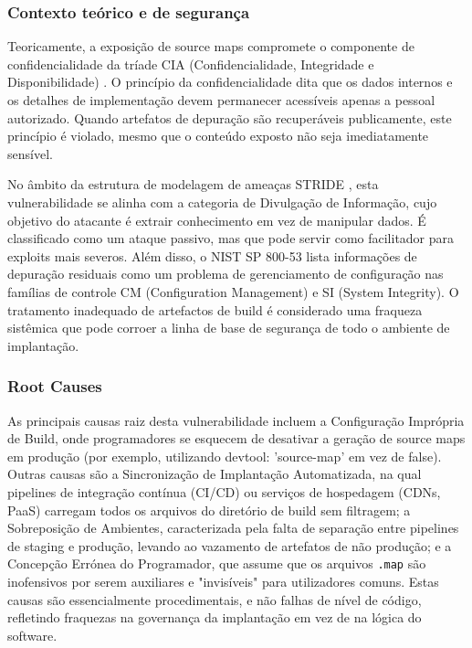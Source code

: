 \subsubsection{Contexto teórico e de segurança}
\label{subsubsec:contexto-teorico-SME}

Teoricamente, a exposição de source maps compromete o componente de confidencialidade da tríade CIA (Confidencialidade, Integridade e Disponibilidade) \cite{ref47}. O princípio da confidencialidade dita que os dados internos e os detalhes de implementação devem permanecer acessíveis apenas a pessoal autorizado. Quando artefatos de depuração são recuperáveis publicamente, este princípio é violado, mesmo que o conteúdo exposto não seja imediatamente sensível. 

No âmbito da estrutura de modelagem de ameaças STRIDE \cite{ref44}, esta vulnerabilidade se alinha com a categoria de Divulgação de Informação, cujo objetivo do atacante é extrair conhecimento em vez de manipular dados. É classificado como um ataque passivo, mas que pode servir como facilitador para exploits mais severos. Além disso, o NIST SP 800-53 \cite{ref3} lista informações de depuração residuais como um problema de gerenciamento de configuração nas famílias de controle CM (Configuration Management) e SI (System Integrity). O tratamento inadequado de artefactos de build é considerado uma fraqueza sistêmica que pode corroer a linha de base de segurança de todo o ambiente de implantação. 

\subsubsection{Root Causes}
\label{subsubsec:root-causes-SME}

As principais causas raiz desta vulnerabilidade incluem a Configuração Imprópria de Build, onde programadores se esquecem de desativar a geração de source maps em produção (por exemplo, utilizando devtool: 'source-map' em vez de false). Outras causas são a Sincronização de Implantação Automatizada, na qual pipelines de integração contínua (CI/CD) ou serviços de hospedagem (CDNs, PaaS) carregam todos os arquivos do diretório de build sem filtragem; a Sobreposição de Ambientes, caracterizada pela falta de separação entre pipelines de staging e produção, levando ao vazamento de artefatos de não produção; e a Concepção Errónea do Programador, que assume que os arquivos \texttt{.map} são inofensivos por serem auxiliares e "invisíveis" para utilizadores comuns. Estas causas são essencialmente procedimentais, e não falhas de nível de código, refletindo fraquezas na governança da implantação em vez de na lógica do software. \cite{ref8}


